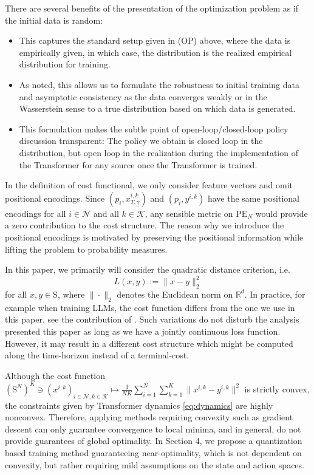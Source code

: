 \documentclass[11pt]{article}
\newcommand{\RR}{\mathbb{R}}
\newcommand{\cK}{\mathcal{K}}
\newcommand{\cN}{\mathcal{N}}
\begin{document}
There are several benefits of the presentation of the optimization problem as if the initial data is random: 
\begin{itemize}
\item[(i)] This captures the standard setup given in (OP) above, where the data is empirically given, in which case, the distribution is the realized empirical distribution for training. 
\item[(ii)] As noted, this allows us to formulate the robustness to initial training data and asymptotic consistency as the data converges weakly or in the Wasserstein sense to a true distribution based on which data is generated. 
\item[(iii)] This formulation makes the subtle point of open-loop/closed-loop policy discussion transparent: The policy we obtain is closed loop in the distribution, but open loop in the realization during the implementation of the Transformer for any source once the Transformer is trained.
\end{itemize}

In the definition of cost functional, we only consider feature vectors and omit positional encodings. Since $(p_i,x_{T,\underline{\gamma}}^{i,k})$ and $(p_i, y^{i,k})$ have the same positional encodings for all $i\in\cN$ and all $k\in\cK$, any sensible metric on $\mathrm{PE}_N$ would provide a zero contribution to the cost structure. The reason why we introduce the positional encodings is motivated by preserving the positional information while lifting the problem to probability measures.

In this paper, we primarily will consider the quadratic distance criterion, i.e.
\begin{equation}
    L(x,y) := \|x-y\|_2^2
\end{equation}
for all $x,y\in\mathrm{S}$, where $\|\cdot\|_2$ denotes the Euclidean norm on $\RR^d$. In practice, for example when training LLMs, the cost function differs from the one we use in this paper, see the contribution of \cite{phuong2022formal}. Such variations do not disturb the analysis presented this paper as long as we have a jointly continuous loss function. However, it may result in a different cost structure which might be computed along the time-horizon instead of a terminal-cost.

Although the cost function $(\mathrm{S}^N)^K\ni(x^{i,k})_{i\in\cN,k\in\cK}\mapsto\frac{1}{NK}\sum_{i=1}^N\sum_{k=1}^K\|x^{i,k}-y^{i,k}\|^2$ is strictly convex, the constraints given by Transformer dynamics \eqref{eq:dynamics} are highly nonconvex. Therefore, applying methods requiring convexity such as gradient descent can only guarantee convergence to local minima, and in general, do not provide guarantees of global optimality. In Section 4, we propose a quantization based training method guaranteeing near-optimality, which is not dependent on convexity, but rather requiring mild assumptions on the state and action spaces. 
\end{document}
